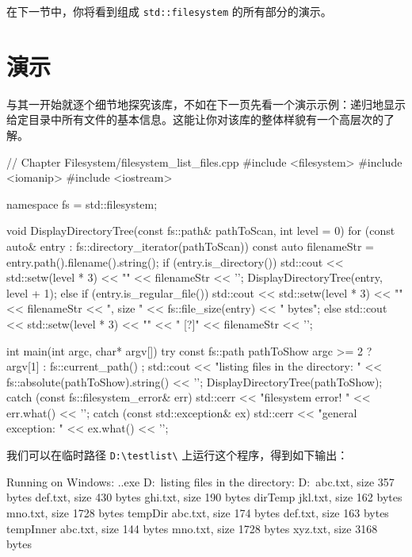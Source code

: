 在下一节中，你将看到组成 \texttt{std::filesystem} 的所有部分的演示。

\section{演示}

与其一开始就逐个细节地探究该库，不如在下一页先看一个演示示例：递归地显示给定目录中所有文件的基本信息。这能让你对该库的整体样貌有一个高层次的了解。

\begin{codebox}[cpp]
// Chapter Filesystem/filesystem_list_files.cpp
#include <filesystem>
#include <iomanip>
#include <iostream>

namespace fs = std::filesystem;

void DisplayDirectoryTree(const fs::path& pathToScan, int level = 0) {
    for (const auto& entry : fs::directory_iterator(pathToScan)) {
        const auto filenameStr = entry.path().filename().string();
        if (entry.is_directory()) {
            std::cout << std::setw(level * 3) << "" << filenameStr << '\n';
            DisplayDirectoryTree(entry, level + 1);
        }
        else if (entry.is_regular_file()) {
            std::cout << std::setw(level * 3) << "" << filenameStr
                      << ", size " << fs::file_size(entry) << " bytes\n";
        }
        else
            std::cout << std::setw(level * 3) << "" << " [?]" << filenameStr << '\n';
    }
}

int main(int argc, char* argv[]) {
    try {
        const fs::path pathToShow{ argc >= 2 ? argv[1] : fs::current_path() };
        std::cout << "listing files in the directory: "
                  << fs::absolute(pathToShow).string() << '\n';
        DisplayDirectoryTree(pathToShow);
    }
    catch (const fs::filesystem_error& err) {
        std::cerr << "filesystem error! " << err.what() << '\n';
    }
    catch (const std::exception& ex) {
        std::cerr << "general exception: " << ex.what() << '\n';
    }
}
\end{codebox}

我们可以在临时路径 \texttt{D:\textbackslash testlist\textbackslash} 上运行这个程序，得到如下输出：

\begin{codebox}[cpp]
Running on Windows:
.\ListFiles.exe D:\testlist\
listing files in the directory: D:\testlist\
abc.txt, size 357 bytes
def.txt, size 430 bytes
ghi.txt, size 190 bytes
dirTemp
  jkl.txt, size 162 bytes
  mno.txt, size 1728 bytes
tempDir
  abc.txt, size 174 bytes
  def.txt, size 163 bytes
  tempInner
    abc.txt, size 144 bytes
    mno.txt, size 1728 bytes
    xyz.txt, size 3168 bytes
\end{codebox}

